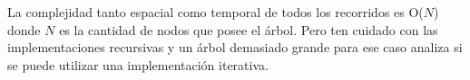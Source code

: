 La complejidad tanto espacial como temporal de todos los recorridos es O($N$) donde $N$ es la cantidad de nodos que posee el árbol. Pero ten cuidado con las implementaciones recursivas y un árbol demasiado grande para ese caso analiza si se puede utilizar una implementación iterativa.